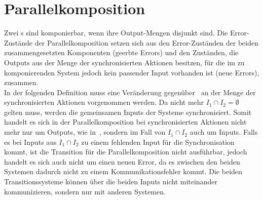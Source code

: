 \section{Parallelkomposition}
Zwei \EIO{}s sind komponierbar, wenn ihre Output-Mengen disjunkt sind. Die
Error-Zustän\-de der Parallelkomposition setzen sich aus den Error-Zuständen der
beiden zusammengesetzten Komponenten (geerbte Errors) und den Zuständen, die
Outputs aus der Menge der synchronisierten Aktionen besitzen, für die im zu
komponierenden System jedoch kein passender Input vorhanden ist (neue Errors),
zusammen.\\
In der folgenden Definition muss eine Veränderung
gegenüber~\cite{Vogler2014EIO} an der Menge der synchronisierten
Aktionen vorgenommen werden. Da nicht mehr $I_1\cap I_2 =\emptyset$ gelten
muss, werden die gemeinsamen Inputs der Systeme synchronisiert. Somit handelt es sich in
der Parallelkomposition bei synchronisierten Aktionen nicht mehr nur um
Outputs, wie in~\cite{Vogler2014EIO}, sondern im Fall von $I_1\cap I_2$ auch um
Inputs. Falls es bei Inputs aus $I_1\cap I_2$ zu einem fehlenden Input für die
Synchronisation kommt, ist die Transition für die Parallelkomposition nicht
ausführbar, jedoch handelt es sich auch nicht um einen neuen Error, da es
zwischen den beiden Systemen dadurch nicht zu einem Kommunikationsfehler
kommt. Die beiden Transitionssysteme können über die beiden Inputs nicht
miteinander kommunizieren, sondern nur mit anderen Systemen.

